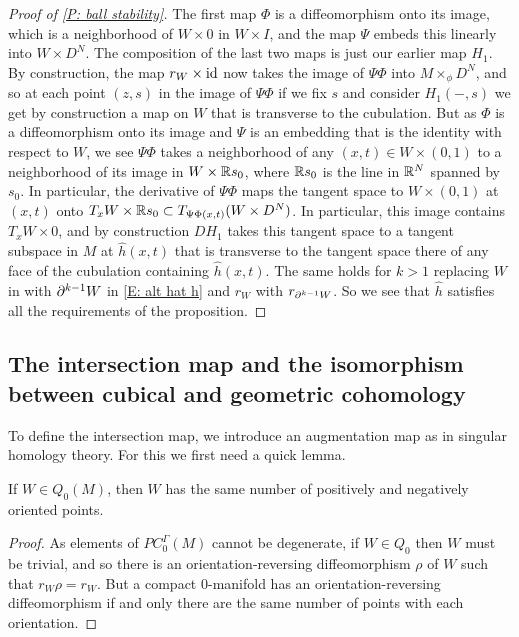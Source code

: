 \begin{proof}[Proof of \cref{P: ball stability}]
The first map $\Phi$ is a diffeomorphism onto its image, which is a neighborhood of $W\times 0$ in $W\times I$, and the map $\Psi$ embeds this linearly into $W\times D^N$. The composition of the last two maps is just our earlier map $H_1$. By construction, the map $r_W\times \mathrm{id}$ now takes the image of $\Psi\Phi$ into $M\times_\phi D^N$, and so at each point $(z,s)$ in the image of $\Psi\Phi$ if we fix $s$ and consider $H_1(-,s)$ we get by construction a map on $W$ that is transverse to the cubulation. But as $\Phi$ is a diffeomorphism onto its image and $\Psi$ is an embedding that is the identity with respect to $W$, we see $\Psi\Phi$ takes a neighborhood of any $(x,t)\in W\times (0,1)$ to a neighborhood of its image in $W\times \mathbb{R} s_0$, where $\mathbb{R} s_0$ is the line in $\mathbb{R}^N$ spanned by $s_0$. In particular, the derivative of $\Psi\Phi$ maps the tangent space to $W\times (0,1)$ at $(x,t)$ onto $ T_xW\times \mathbb{R} s_0\subset T_{\Psi\Phi(x,t)}(W\times D^N)$. In particular, this image contains $T_xW\times 0$, and by construction $DH_1$ takes this tangent space to a tangent subspace in $M$ at $\hat h(x,t)$ that is transverse to the tangent space there of any face of the cubulation containing  $\hat h(x,t)$. The same holds for $k>1$ replacing $W$ in with $\partial^{k-1}W$ in \eqref{E: alt hat h} and $r_W$ with $r_{\partial^{k-1}W}$. So we see that $\hat h$ satisfies all the requirements of the proposition.
\end{proof}






\subsection{The intersection map and the isomorphism between cubical and geometric cohomology}\label{S: intersection map}

To define the intersection map, we introduce an augmentation map as in singular homology theory. For this we first need a quick lemma.

\begin{lemma}\label{L: Q0}
If $W\in Q_0(M)$, then $W$ has the same number of positively and negatively oriented points. 
\end{lemma}
\begin{proof}
 As elements of $PC_0^\Gamma(M)$ cannot be degenerate, if $W\in Q_0$ then $W$ must be trivial, and so there is an orientation-reversing diffeomorphism $\rho$ of $W$ such that $r_W\rho=r_W$. But a compact $0$-manifold has an orientation-reversing diffeomorphism if and only there are the same number of points with each orientation.
\end{proof}

